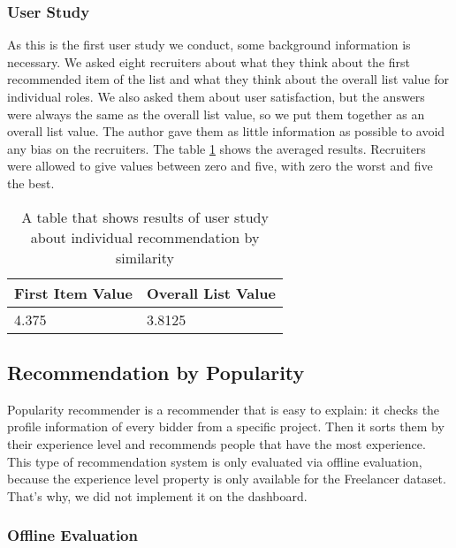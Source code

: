 \subsubsection{User Study}\label{subsubsection:user-study-first}

As this is the first user study we conduct, some background information is necessary. We asked eight recruiters about what they think about the first recommended item of the list and what they think about the overall list value for individual roles. We also asked them about user satisfaction, but the answers were always the same as the overall list value, so we put them together as an overall list value. The author gave them as little information as possible to avoid any bias on the recruiters. The table \ref{tab:user-study-individual-rec-similarity} shows the averaged results. Recruiters were allowed to give values between zero and five, with zero the worst and five the best.

\begin{table}[ht]
	\caption[User Study Individual Similarity]{A table that shows results of user study about individual recommendation by similarity}\label{tab:user-study-individual-rec-similarity}
	\centering
	\begin{tabular}{l l}
		\toprule
		First Item Value & Overall List Value \\
		\midrule
		4.375 & 3.8125 \\
		\bottomrule
	\end{tabular}
\end{table}



\subsection{Recommendation by Popularity}\label{subsubsection:eval-popularity}

Popularity recommender is a recommender that is easy to explain: it checks the profile information of every bidder from a specific project. Then it sorts them by their experience level and recommends people that have the most experience. This type of recommendation system is only evaluated via offline evaluation, because the experience level property is only available for the Freelancer dataset. That's why, we did not implement it on the dashboard. 

\subsubsection{Offline Evaluation}

